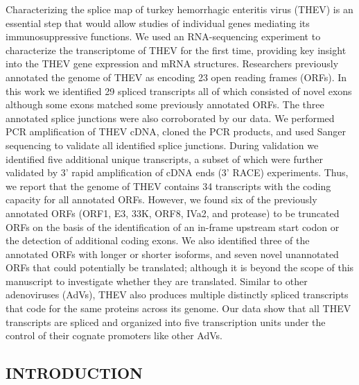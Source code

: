 \documentclass[
]{article}
\begin{document}
Characterizing the splice map of turkey hemorrhagic enteritis virus
(THEV) is an essential step that would allow studies of individual genes
mediating its immunosuppressive functions. We used an RNA-sequencing
experiment to characterize the transcriptome of THEV for the first time,
providing key insight into the THEV gene expression and mRNA structures.
Researchers previously annotated the genome of THEV as encoding 23 open
reading frames (ORFs). In this work we identified 29 spliced transcripts
all of which consisted of novel exons although some exons matched some
previously annotated ORFs. The three annotated splice junctions were
also corroborated by our data. We performed PCR amplification of THEV
cDNA, cloned the PCR products, and used Sanger sequencing to validate
all identified splice junctions. During validation we identified five
additional unique transcripts, a subset of which were further validated
by 3' rapid amplification of cDNA ends (3' RACE) experiments. Thus, we
report that the genome of THEV contains 34 transcripts with the coding
capacity for all annotated ORFs. However, we found six of the previously
annotated ORFs (ORF1, E3, 33K, ORF8, IVa2, and protease) to be truncated
ORFs on the basis of the identification of an in-frame upstream start
codon or the detection of additional coding exons. We also identified
three of the annotated ORFs with longer or shorter isoforms, and seven
novel unannotated ORFs that could potentially be translated; although it
is beyond the scope of this manuscript to investigate whether they are
translated. Similar to other adenoviruses (AdVs), THEV also produces
multiple distinctly spliced transcripts that code for the same proteins
across its genome. Our data show that all THEV transcripts are spliced
and organized into five transcription units under the control of their
cognate promoters like other AdVs. \newpage

\subsection{INTRODUCTION}\label{introduction}
\end{document}
